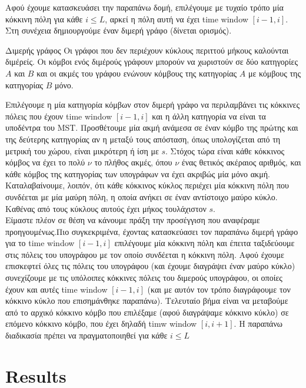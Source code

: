 \documentclass[oneside,12pt]{book}
\theoremstyle{definition}
\begin{document}
Αφού έχουμε κατασκευάσει την παραπάνω δομή, επιλέγουμε με τυχαίο τρόπο μία κόκκινη πόλη για κάθε \(i \leq L\), αρκεί η πόλη αυτή να έχει time window \([i-1,i]\). Στη συνέχεια δημιουργούμε έναν διμερή γράφο (δίνεται ορισμός).

\begin{mydefinition}{Διμερής γράφος}{}
	Οι γράφοι που δεν περιέχουν κύκλους περιττού μήκους καλούνται διμέρείς. Οι κόμβοι ενός διμέρούς γράφουν μπορούν να χωριστούν σε δύο κατηγορίες \(Α\) και \(Β\) και οι ακμές του γράφου ενώνουν κόμβους της κατηγορίας \(A\) με κόμβους της κατηγορίας \(B\) μόνο.
\end{mydefinition}

Επιλέγουμε η μία κατηγορία κόμβων στον διμερή γράφο να περιλαμβάνει τις κόκκινες πόλεις που έχουν time window \([i-1,i]\) και η άλλη κατηγορία να είναι τα υποδέντρα του MST. Προσθέτουμε μία ακμή ανάμεσα σε έναν κόμβο της πρώτης και της δεύτερης κατηγορίας αν η μεταξύ τους απόσταση, όπως υπολογίζεται από τη μετρική του χώρου, είναι μικρότερη ή ίση με \(s\). Στόχος τώρα είναι κάθε κόκκινος κόμβος να έχει το πολύ \(ν\) το πλήθος ακμές, όπου \(ν\) ένας θετικός ακέραιος αριθμός, και κάθε κόμβος της κατηγορίας των υπογράφων να έχει ακριβώς μία μόνο ακμή. \\

Καταλαβαίνουμε, λοιπόν, ότι κάθε κόκκινος κύκλος περιέχει μία κόκκινη πόλη που συνδέεται με μία μαύρη πόλη, η οποία ανήκει σε έναν αντίστοιχο μαύρο κύκλο. Καθένας από τους κύκλους αυτούς έχει μήκος τουλάχιστον \(s\). \\

Είμαστε πλέον σε θέση να κάνουμε πράξη την προσέγγιση που αναφέραμε προηγουμένως.Πιο συγκεκριμένα, έχοντας κατασκεύασει τον παραπάνω διμερή γράφο για το time window \([i-1,i]\) επιλέγουμε μία κόκκινη πόλη και έπειτα ταξιδεύουμε στις πόλεις του υπογράφου με τον οποίο συνδέεται η κόκκινη πόλη. Αφού έχουμε επισκεφτεί όλες τις πόλεις του υπογράφου (και έχουμε διαγράψει έναν μαύρο κύκλο) συνεχίζουμε με τις υπόλοιπες κόκκινες πόλεις του διμερούς υπογράφου, οι οποίες έχουν και αυτές time window \([i-1,i]\) (και με αυτόν τον τρόπο διαγράφουμε τον κόκκινο κύκλο που επισημάνθηκε παραπάνω). Τελευταίο βήμα είναι να μεταβούμε από το αρχικό κόκκινο κόμβο που επιλέξαμε (αφού διαγράψαμε κόκκινο κύκλο) σε επόμενο κόκκινο κόμβο, που έχει δηλαδή timw window \([i,i+1]\). Η παραπάνω διαδικασία πρέπει να πραγματοποιηθεί για κάθε \(i \leq L\)\\

\chapter{Results}
\end{document}
